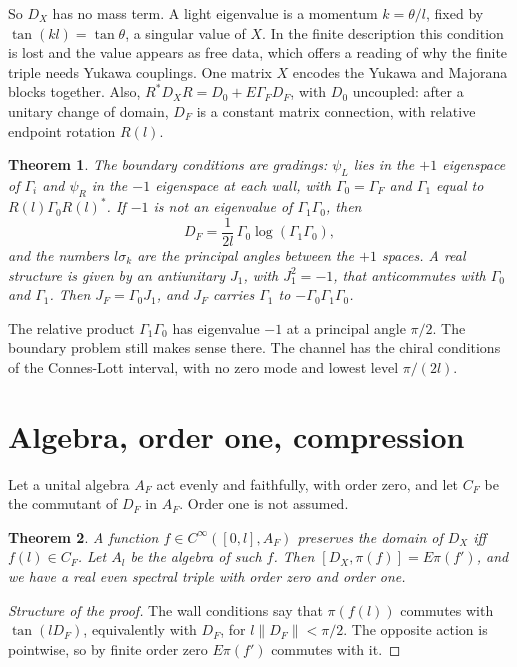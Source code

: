 \documentclass[aps,prd,reprint,onecolumn,nofootinbib,amsmath,amssymb,floatfix]{revtex4-2}
\theoremstyle{plain}
\newtheorem{theorem}{Theorem}
\begin{document}
So $D_X$ has no mass term. A light eigenvalue is a momentum $k=\theta/l$, fixed by $\tan(kl)=\tan\theta$, a singular value of $X$. In the finite description this condition is lost and the value appears as free data, which offers a reading of why the finite triple needs Yukawa couplings. One matrix $X$ encodes the Yukawa and Majorana blocks together. Also, $R^*D_XR=D_0+E\Gamma_FD_F$, with $D_0$ uncoupled: after a unitary change of domain, $D_F$ is a constant matrix connection, with relative endpoint rotation $R(l)$.

\begin{theorem}\label{thm:gradings}
The boundary conditions are gradings: $\psi_L$ lies in the $+1$ eigenspace of $\Gamma_i$ and $\psi_R$ in the $-1$ eigenspace at each wall, with $\Gamma_0=\Gamma_F$ and $\Gamma_1$ equal to $R(l)\Gamma_0R(l)^*$. If $-1$ is not an eigenvalue of $\Gamma_1\Gamma_0$, then
\begin{equation}
D_F=\frac1{2l}\,\Gamma_0\log(\Gamma_1\Gamma_0),
\end{equation}
and the numbers $l\sigma_k$ are the principal angles between the $+1$ spaces. A real structure is given by an antiunitary $J_1$, with $J_1^2=-1$, that anticommutes with $\Gamma_0$ and $\Gamma_1$. Then $J_F=\Gamma_0J_1$, and $J_F$ carries $\Gamma_1$ to $-\Gamma_0\Gamma_1\Gamma_0$.
\end{theorem}

The relative product $\Gamma_1\Gamma_0$ has eigenvalue $-1$ at a principal angle $\pi/2$. The boundary problem still makes sense there. The channel has the chiral conditions of the Connes-Lott interval, with no zero mode and lowest level $\pi/(2l)$.

\section{Algebra, order one, compression}

Let a unital algebra $A_F$ act evenly and faithfully, with order zero, and let $C_F$ be the commutant of $D_F$ in $A_F$. Order one is not assumed.

\begin{theorem}\label{thm:parent}
A function $f\in C^\infty([0,l],A_F)$ preserves the domain of $D_X$ iff $f(l)\in C_F$. Let $A_l$ be the algebra of such $f$. Then $[D_X,\pi(f)]=E\pi(f')$, and we have a real even spectral triple with order zero and order one.
\end{theorem}

\begin{proof}[Structure of the proof]
The wall conditions say that $\pi(f(l))$ commutes with $\tan(lD_F)$, equivalently with $D_F$, for $l\|D_F\|<\pi/2$. The opposite action is pointwise, so by finite order zero $E\pi(f')$ commutes with it.
\end{proof}
\end{document}
